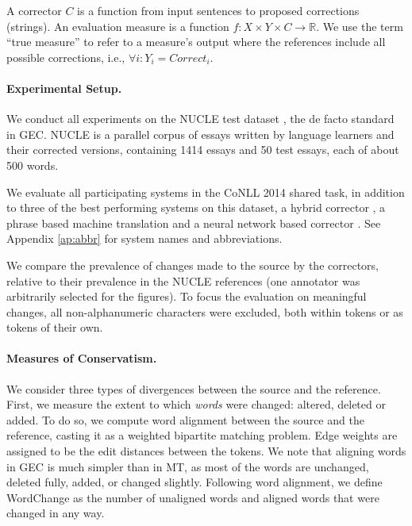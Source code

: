 \documentclass[letterpaper, 11pt]{article}
\newcommand{\lc}[1]{\footnote{\color{blue}LC: #1}}
\begin{document}
A corrector $C$ is a function from input sentences to proposed corrections (strings).
An evaluation measure is a function $f\colon X \times Y \times C\to \mathbb{R}$. We use the term ``true measure'' to refer to a measure's output where the references include all possible corrections, 
i.e., $\forall i\colon Y_i=Correct_i$.

\paragraph{Experimental Setup.}\label{par:experimental_setup}
We conduct all experiments on the NUCLE test dataset \cite{dahlmeier2013building},
the de facto standard in GEC.
NUCLE is a parallel corpus of essays written by language learners and their corrected versions,
containing 1414 essays and 50 test essays, each of about 500 words.

We evaluate all participating systems in the CoNLL 2014 shared task,
in addition to three of the best performing systems on this dataset,
a hybrid corrector \cite{rozovskaya2016grammatical}, a phrase based machine translation \cite{junczysdowmunt-grundkiewicz:2016:EMNLP2016} 
and a neural network based corrector \cite{xie2016neural}.
See Appendix \ref{ap:abbr} for system names and abbreviations. 

We compare the prevalence of changes made to the source by the correctors,
relative to their prevalence in the NUCLE references (one annotator was arbitrarily 
selected for the figures). 
To focus the evaluation on meaningful changes, all non-alphanumeric characters were 
excluded, both within tokens or as tokens of their own.

\paragraph{Measures of Conservatism.}
We consider three types of divergences between the source and the reference.
First, we measure the extent to which \emph{words} were changed: altered, deleted or added.
To do so, we compute word alignment between the source and the reference, casting it
as a weighted bipartite matching problem. Edge weights are assigned to be the edit distances between the tokens.
We note that aligning words in GEC is much simpler than in MT,
as most of the words are unchanged, deleted fully, added, or changed slightly.
Following word alignment, we define {\sc WordChange}
as the number of unaligned words and aligned words that were changed in any way.
\end{document}
